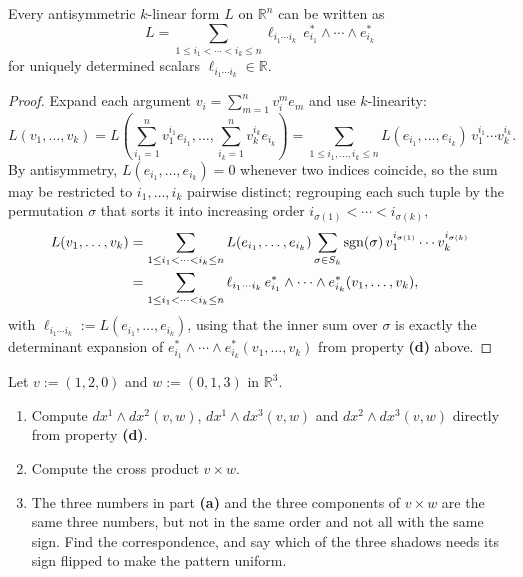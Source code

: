 \begin{proposition}
\label{prop:k_form_basis_expansion}
Every antisymmetric $k$-linear form $L$ on $\mathbb{R}^n$ can be written as
\[L = \sum_{1\leq i_1<\cdots<i_k\leq n} \ell_{i_1\cdots i_k}\,e_{i_1}^*\wedge\cdots\wedge
  e_{i_k}^*\]
for uniquely determined scalars $\ell_{i_1\cdots i_k} \in \mathbb{R}$.
\end{proposition}

\begin{proof}
Expand each argument $v_i = \sum_{m=1}^n v_i^m e_m$ and use $k$-linearity:
\[L(v_1,\ldots,v_k) = L\!\left(\sum_{i_1=1}^n v_1^{i_1}e_{i_1},\ldots,\sum_{i_k=1}^n
  v_k^{i_k}e_{i_k}\right) = \sum_{1\leq i_1,\ldots,i_k\leq n} L(e_{i_1},\ldots,e_{i_k})\,
  v_1^{i_1}\cdots v_k^{i_k}.\]
By antisymmetry, $L(e_{i_1},\ldots,e_{i_k}) = 0$ whenever two indices coincide, so the sum may
be restricted to $i_1,\ldots,i_k$ pairwise distinct; regrouping each such tuple by the
permutation $\sigma$ that sorts it into increasing order $i_{\sigma(1)}<\cdots<i_{\sigma(k)}$,
\begin{align}
L(v_1,\ldots,v_k) &= \sum_{1\leq i_1<\cdots<i_k\leq n} L(e_{i_1},\ldots,e_{i_k})
  \sum_{\sigma\in S_k} \operatorname{sgn}(\sigma)\,v_1^{i_{\sigma(1)}}\cdots v_k^{i_{\sigma(k)}} \nonumber \\
  &= \sum_{1\leq i_1<\cdots<i_k\leq n} \ell_{i_1\cdots i_k}\,e_{i_1}^*\wedge\cdots\wedge
  e_{i_k}^*(v_1,\ldots,v_k), \nonumber
\end{align}
with $\ell_{i_1\cdots i_k} := L(e_{i_1},\ldots,e_{i_k})$, using that the inner sum over $\sigma$
is exactly the determinant expansion of $e_{i_1}^*\wedge\cdots\wedge e_{i_k}^*(v_1,\ldots,v_k)$
from property \textbf{(d)} above.
\end{proof}

\begin{aiexercise}
\label{ex:ai_three_shadows}
Let $v := (1,2,0)$ and $w := (0,1,3)$ in $\mathbb{R}^3$.
\begin{enumerate}[label=\textbf{(\alph*)}]
  \item Compute $dx^1\wedge dx^2(v,w)$, $dx^1\wedge dx^3(v,w)$ and $dx^2\wedge dx^3(v,w)$
    directly from property \textbf{(d)}.
  \item Compute the cross product $v \times w$.
  \item The three numbers in part \textbf{(a)} and the three components of $v \times w$ are the
    same three numbers, but not in the same order and not all with the same sign. Find the
    correspondence,
    and say which of the three shadows needs its sign flipped to make the pattern uniform.
\end{enumerate}
\end{aiexercise}

